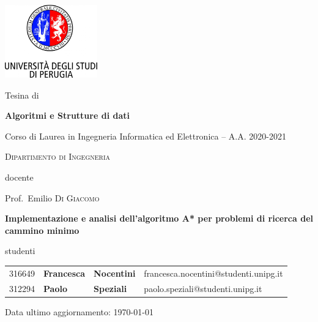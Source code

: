 \documentclass[12pt,a4paper]{report}
\begin{document}
\begin{titlepage}
	\centering
	\includegraphics[width=0.30\textwidth]{logo-unipg}\par\vspace{1cm}
	\large{Tesina di}\par
	\large{\textbf{Algoritmi e Strutture di dati}}\par
	\small{Corso di Laurea in Ingegneria Informatica ed Elettronica -- A.A. 2020-2021}\par
	\textsc{\small{Dipartimento di Ingegneria}}\par

	\vspace{0.5cm}
	docente\par
	Prof.~Emilio \textsc{Di Giacomo}

	\vspace{1cm}
	\vspace{1cm}
	\textbf{\Large{Implementazione e analisi dell'algoritmo A* per problemi di ricerca del cammino minimo}}\par
	
	\vspace{1cm}

	\large{studenti}\par
	\vspace{0.2cm}
	\begin{tabular}{ l l l l }
	\large{316649} & \large{\textbf{Francesca}} & \large{\textbf{Nocentini}} & \large{francesca.nocentini@studenti.unipg.it}\\
	\large{312294} & \large{\textbf{Paolo}} & \large{\textbf{Speziali}} & \large{paolo.speziali@studenti.unipg.it}\\
	\end{tabular}

	\vfill
	\raggedright
	\small{Data ultimo aggiornamento: \today}
\end{titlepage}
\restoregeometry
\end{document}
